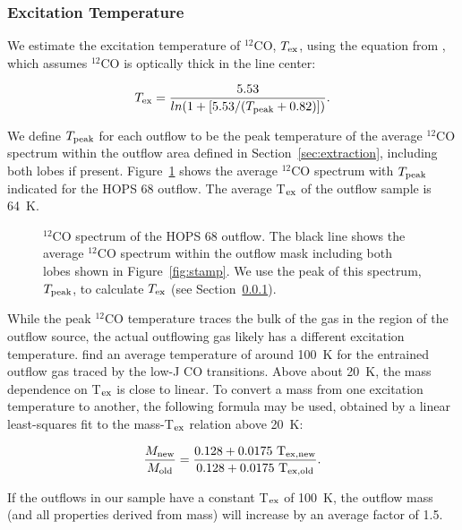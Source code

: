 \documentclass[twocolumn]{aastex63}
\newcommand{\example}{HOPS 68}
\newcommand{\tex}{$T_{\rm ex}$}
\newcommand{\co}[1][]{\ensuremath{^{#1}}CO}
\begin{document}
\subsubsection{Excitation Temperature}\label{sec:tex}
We estimate the excitation temperature of $^{12}$CO, \tex, using the equation from \citet{Rohlfs96}, which assumes $^{12}$CO is optically thick in the line center:

\begin{equation}\label{eq:Tex}
T_{\rm ex} = \frac{5.53}{ln(1 + [5.53/(T_{\rm peak} + 0.82)])}.
\end{equation}

We define $T_{\rm peak}$ for each outflow to be the peak temperature of the average $^{12}$CO spectrum within the outflow area defined in Section~\ref{sec:extraction}, including both lobes if present. Figure~\ref{fig:tex} shows the average $^{12}$CO spectrum with $T_{\rm peak}$ indicated for the \example{} outflow. The average T$_{\rm ex}$ of the outflow sample is 64~K.

\begin{figure}
\caption{\co[12]{} spectrum of the \example{} outflow. The black line shows the average \co[12]{} spectrum within the outflow mask including both lobes shown in Figure~\ref{fig:stamp}. We use the peak of this spectrum, $T_{\rm peak}$, to calculate \tex{} (see Section~\ref{sec:tex}). \label{fig:tex}}
\end{figure}

While the peak $^{12}$CO temperature traces the bulk of the gas in the region of the outflow source, the actual outflowing gas likely has a different excitation temperature. \citet{Yang18} find an average temperature of around 100~K for the entrained outflow gas traced by the low-J CO transitions. Above about 20~K, the mass dependence on T$_{\rm ex}$ is close to linear. To convert a mass from one excitation temperature to another, the following formula may be used, obtained by a linear least-squares fit to the mass-T$_{\rm ex}$ relation above 20~K:

\begin{equation}\label{eq:massTex}
\frac{M_{\rm new}}{M_{\rm old}} = \frac{0.128 + 0.0175~\rm T_{ex, new}}{0.128 + 0.0175~\rm T_{ex, old}}.
\end{equation}

If the outflows in our sample have a constant T$_{\rm ex}$ of 100~K, the outflow mass (and all properties derived from mass) will increase by an average factor of 1.5.
\end{document}
